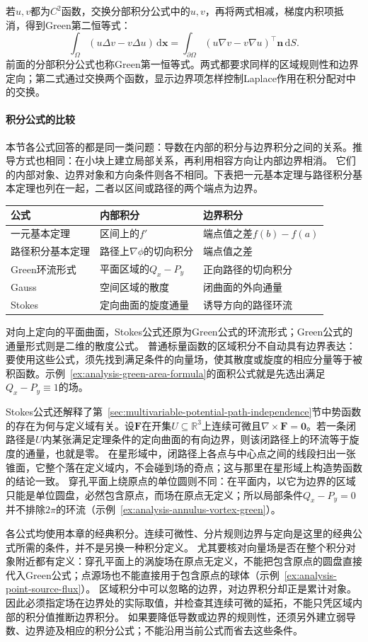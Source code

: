 若$u,v$都为$C^2$函数，交换分部积分公式中的$u,v$，再将两式相减，梯度内积项抵消，得到Green第二恒等式：
\[
 \int_\Omega (u\Delta v-v\Delta u)\,\mathrm d\bm x
 =\int_{\partial\Omega}(u\nabla v-v\nabla u)^\top\bm n\,\mathrm dS.
\]
前面的分部积分公式也称Green第一恒等式。两式都要求同样的区域规则性和边界定向；第二式通过交换两个函数，显示边界项怎样控制Laplace作用在积分配对中的交换。

\paragraph{积分公式的比较}

本节各公式回答的都是同一类问题：导数在内部的积分与边界积分之间的关系。推导方式也相同：在小块上建立局部关系，再利用相容方向让内部边界相消。
它们的内部对象、边界对象和方向条件则各不相同。下表把一元基本定理与路径积分基本定理也列在一起，二者以区间或路径的两个端点为边界。
\begin{center}
\begin{tabular}{lll}
\toprule
公式 & 内部积分 & 边界积分\\
\midrule
一元基本定理 & 区间上的$f'$ & 端点值之差$f(b)-f(a)$\\
路径积分基本定理 & 路径上$\nabla\phi$的切向积分 & 端点值之差\\
Green环流形式 & 平面区域的$Q_x-P_y$ & 正向路径的切向积分\\
Gauss & 空间区域的散度 & 闭曲面的外向通量\\
Stokes & 定向曲面的旋度通量 & 诱导方向的路径环流\\
\bottomrule
\end{tabular}
\end{center}
对向上定向的平面曲面，Stokes公式还原为Green公式的环流形式；Green公式的通量形式则是二维的散度公式。
普通标量函数的区域积分不自动具有边界表达：要使用这些公式，须先找到满足条件的向量场，使其散度或旋度的相应分量等于被积函数。示例~\ref{ex:analysis-green-area-formula}的面积公式就是先选出满足$Q_x-P_y\equiv1$的场。

Stokes公式还解释了第~\ref{sec:multivariable-potential-path-independence}节中势函数的存在为何与定义域有关。设$\bm F$在开集$U\subseteq\mathbb R^3$上连续可微且$\nabla\times\bm F=\bm0$。若一条闭路径是$U$内某张满足定理条件的定向曲面的有向边界，则该闭路径上的环流等于旋度的通量，也就是零。
在星形域中，闭路径上各点与中心点之间的线段扫出一张锥面，它整个落在定义域内，不会碰到场的奇点；这与那里在星形域上构造势函数的结论一致。
穿孔平面上绕原点的单位圆则不同：在平面内，以它为边界的区域只能是单位圆盘，必然包含原点，而场在原点无定义；所以局部条件$Q_x-P_y=0$并不排除$2\pi$的环流（示例~\ref{ex:analysis-annulus-vortex-green}）。

各公式均使用本章的经典积分。连续可微性、分片规则边界与定向是这里的经典公式所需的条件，并不是另换一种积分定义。
尤其要核对向量场是否在整个积分对象附近都有定义：穿孔平面上的涡旋场在原点无定义，不能把包含原点的圆盘直接代入Green公式；点源场也不能直接用于包含原点的球体（示例~\ref{ex:analysis-point-source-flux}）。
区域积分中可以忽略的边界，对边界积分却正是累计对象。因此必须指定场在边界处的实际取值，并检查其连续可微的延拓，不能只凭区域内部的积分值推断边界积分。
如果要降低导数或边界的规则性，还须另外建立弱导数、边界迹及相应的积分公式；不能沿用当前公式而省去这些条件。

\FloatBarrier
